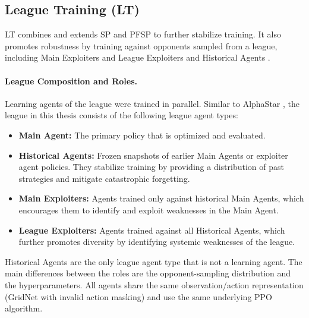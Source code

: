 \documentclass[10pt,twocolumn,letterpaper]{article}
\begin{document}




\subsection{League Training (LT)}
\label{sec:LT}
LT combines and extends SP and PFSP to further stabilize training.
It also promotes robustness by training against opponents sampled from a league, including Main Exploiters and League Exploiters and Historical Agents \cite{vinyals2019alphastar}.

\paragraph{League Composition and Roles.} 
Learning agents of the league were trained in parallel.
Similar to AlphaStar \cite{vinyals2019alphastar}, the league in this thesis consists of the following league agent types:
\begin{itemize}
    \item \textbf{Main Agent:} The primary policy that is optimized and evaluated.
    \item \textbf{Historical Agents:} Frozen snapshots of earlier Main Agents or exploiter agent policies. 
    They stabilize training by providing a distribution of past strategies and mitigate catastrophic forgetting.
    \item \textbf{Main Exploiters:} Agents trained only against historical Main Agents, which encourages them to identify and exploit weaknesses in the Main Agent.
    \item \textbf{League Exploiters:} Agents trained against all Historical Agents, which further promotes diversity by identifying systemic weaknesses of the league.
\end{itemize}
Historical Agents are the only league agent type that is not a learning agent.
The main differences between the roles are the opponent-sampling distribution and the hyperparameters.
All agents share the same observation/action representation (GridNet with invalid action masking) and use the same underlying PPO algorithm.
\end{document}
